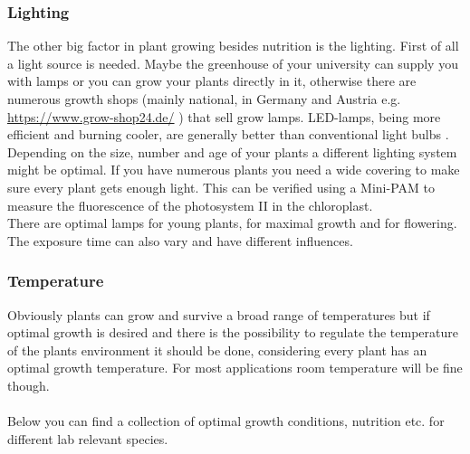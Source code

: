 \subsubsection{Lighting}
The other big factor in plant growing besides nutrition is the lighting. First of all a light source is needed. Maybe the greenhouse of your university can supply you with lamps or you can grow your plants directly in it, otherwise there are numerous growth shops (mainly national, in Germany and Austria e.g. \href{https://www.grow-shop24.de/}{https://www.grow-shop24.de/} ) that sell grow lamps. LED-lamps, being more efficient and burning cooler, are generally better than conventional light bulbs \parencite{Goto2012}. Depending on the size, number and age of your plants a different lighting system  might be optimal. If you have numerous plants you need a wide covering to make sure every plant gets enough light. This can be verified using a Mini-PAM to measure the fluorescence of the photosystem II in the chloroplast. \\
There are optimal lamps for young plants, for maximal growth and for flowering. The exposure time can also vary and have different influences.

\subsubsection{Temperature}
Obviously plants can grow and survive a broad range of temperatures but if optimal growth is desired and there is the possibility to regulate the temperature of the plants environment it should be done, considering every plant has an optimal growth temperature. For most applications room temperature will be fine though. \\ \\
Below you can find a collection of optimal growth conditions, nutrition etc. for different lab relevant species.

